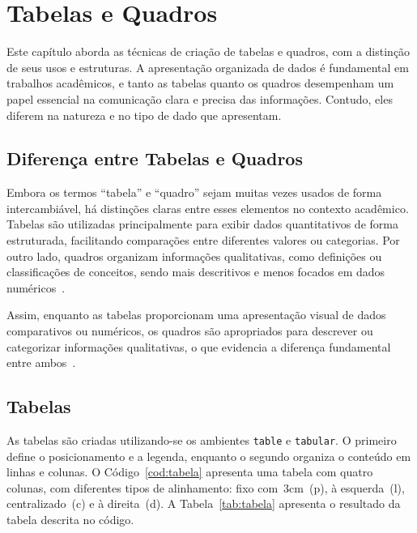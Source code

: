 
\chapter{Tabelas e Quadros}
\label{cap:tabelas}

Este capítulo aborda as técnicas de criação de tabelas e quadros, com a distinção de seus usos e estruturas. A apresentação organizada de dados é fundamental em trabalhos acadêmicos, e tanto as tabelas quanto os quadros desempenham um papel essencial na comunicação clara e precisa das informações. Contudo, eles diferem na natureza e no tipo de dado que apresentam.

\section{Diferença entre Tabelas e Quadros}

Embora os termos ``tabela'' e ``quadro'' sejam muitas vezes usados de forma intercambiável, há distinções claras entre esses elementos no contexto acadêmico. Tabelas são utilizadas principalmente para exibir dados quantitativos de forma estruturada, facilitando comparações entre diferentes valores ou categorias. Por outro lado, quadros organizam informações qualitativas, como definições ou classificações de conceitos, sendo mais descritivos e menos focados em dados numéricos~\cite{abnt2018}.

Assim, enquanto as tabelas proporcionam uma apresentação visual de dados comparativos ou numéricos, os quadros são apropriados para descrever ou categorizar informações qualitativas, o que evidencia a diferença fundamental entre ambos~\cite{chagas2016}.

\section{Tabelas}

As tabelas são criadas utilizando-se os ambientes \texttt{table} e \texttt{tabular}. O primeiro define o posicionamento e a legenda, enquanto o segundo organiza o conteúdo em linhas e colunas. O Código~\ref{cod:tabela} apresenta uma tabela com quatro colunas, com diferentes tipos de alinhamento: fixo com~3cm~(p), à esquerda~(l), centralizado~(c) e à direita~(d). A Tabela~\ref{tab:tabela} apresenta o resultado da tabela descrita no código.


